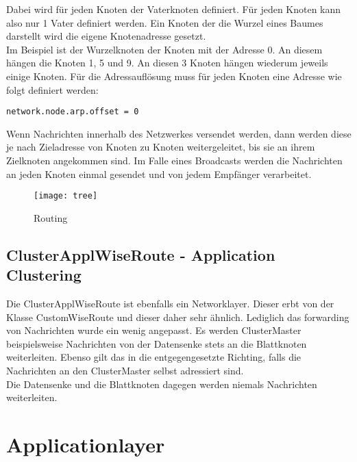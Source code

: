 Dabei wird für jeden Knoten der Vaterknoten definiert. Für jeden Knoten kann also nur 1 Vater definiert werden. Ein Knoten der die Wurzel eines Baumes darstellt wird die eigene Knotenadresse gesetzt.\\
Im Beispiel ist der Wurzelknoten der Knoten mit der Adresse 0. An diesem hängen die Knoten 1, 5 und 9. An diesen 3 Knoten hängen wiederum jeweils einige Knoten. Für die Adressauflösung muss für jeden Knoten eine Adresse wie folgt definiert werden:

\begin{minipage}{\textwidth}
\begin{lstlisting}
network.node.arp.offset = 0
\end{lstlisting}
\end{minipage}

Wenn Nachrichten innerhalb des Netzwerkes versendet werden, dann werden diese je nach Zieladresse von Knoten zu Knoten weitergeleitet, bis sie an ihrem Zielknoten angekommen sind. Im Falle eines Broadcasts werden die Nachrichten an jeden Knoten einmal gesendet und von jedem Empfänger verarbeitet.

\begin{figure}[htbp]
\centering
\caption{Routing}
\label{fig:routingbsp}
\texttt{[image: tree]}
\end{figure}

\subsection{ClusterApplWiseRoute - Application Clustering}
Die ClusterApplWiseRoute ist ebenfalls ein Networklayer. Dieser erbt von der Klasse CustomWiseRoute und dieser daher sehr ähnlich. Lediglich das forwarding von Nachrichten wurde ein wenig angepasst. Es werden ClusterMaster beispielsweise Nachrichten von der Datensenke stets an die Blattknoten weiterleiten. Ebenso gilt das in die entgegengesetzte Richting, falls die Nachrichten an den ClusterMaster selbst adressiert sind.\\
Die Datensenke und die Blattknoten dagegen werden niemals Nachrichten weiterleiten.

\section{Applicationlayer}


